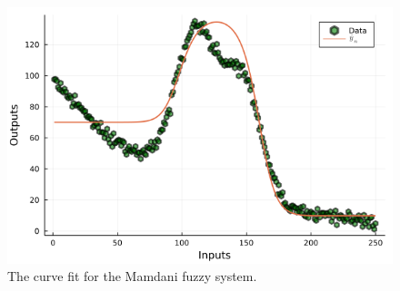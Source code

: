 \documentclass[english]{sobraep}
\begin{document}
\begin{figure}
    \centering
    \includegraphics[scale=0.4]{../figs/mamdani_fuzzy/fuzzy_prediction.png}
    \caption{The curve fit for the Mamdani fuzzy system.}
    \label{fig:mamdani-fuzzy-regression}
\end{figure}




\balance
\end{document}
